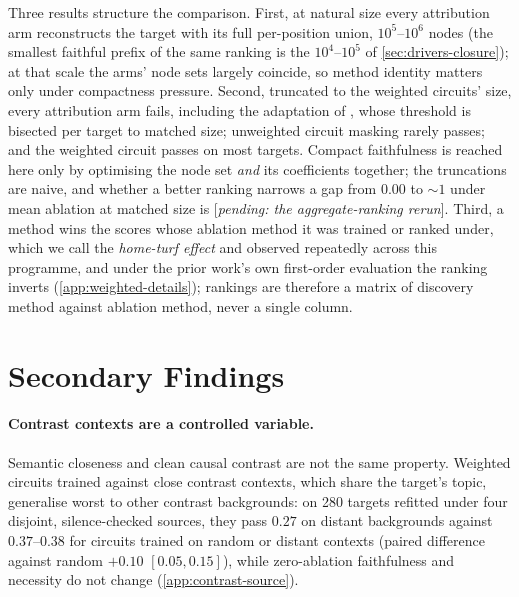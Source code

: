 \documentclass[10pt]{article}
\newcommand{\pending}[1]{\textcolor{red!70!black}{[\textit{pending: #1}]}}
\begin{document}
Three results structure the comparison.
First, at natural size every attribution arm reconstructs the target with its full per-position union, $10^{5}$--$10^{6}$ nodes (the smallest faithful prefix of the same ranking is the $10^{4}$--$10^{5}$ of \cref{sec:drivers-closure}); at that scale the arms' node sets largely coincide, so method identity matters only under compactness pressure.
Second, truncated to the weighted circuits' size, every attribution arm fails, including the adaptation of \citet{ge2024automatically}, whose threshold is bisected per target to matched size; unweighted circuit masking rarely passes; and the weighted circuit passes on most targets.
Compact faithfulness is reached here only by optimising the node set \emph{and} its coefficients together; the truncations are naive, and whether a better ranking narrows a gap from $0.00$ to ${\sim}1$ under mean ablation at matched size is \pending{the aggregate-ranking rerun}.
Third, a method wins the scores whose ablation method it was trained or ranked under, which we call the \emph{home-turf effect} and observed repeatedly across this programme, and under the prior work's own first-order evaluation the ranking inverts (\cref{app:weighted-details}); rankings are therefore a matrix of discovery method against ablation method, never a single column.

\section{Secondary Findings}
\label{app:secondary}
\label{sec:secondary}

\paragraph{Contrast contexts are a controlled variable.}
Semantic closeness and clean causal contrast are not the same property.
Weighted circuits trained against close contrast contexts, which share the target's topic, generalise worst to other contrast backgrounds: on 280 targets refitted under four disjoint, silence-checked sources, they pass $0.27$ on distant backgrounds against $0.37$--$0.38$ for circuits trained on random or distant contexts (paired difference against random $+0.10$ $[0.05, 0.15]$), while zero-ablation faithfulness and necessity do not change (\cref{app:contrast-source}).
\end{document}
